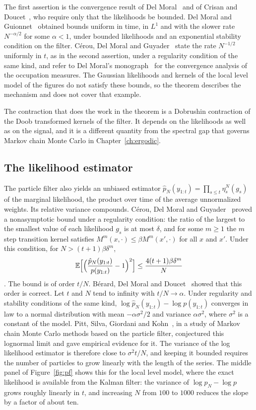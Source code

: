The first assertion is the convergence result of Del Moral~\cite{delmoral1998} and of Crisan and Doucet~\cite{crisandoucet2002}, who require only that the likelihoods be bounded. Del Moral and Guionnet~\cite{delmoralguionnet2001} obtained bounds uniform in time, in $L^1$ and with the slower rate $N^{-\alpha/2}$ for some $\alpha<1$, under bounded likelihoods and an exponential stability condition on the filter. C\'erou, Del Moral and Guyader~\cite{cdg2011} state the rate $N^{-1/2}$ uniformly in $t$, as in the second assertion, under a regularity condition of the same kind, and refer to Del Moral's monograph~\cite{delmoral2004} for the convergence analysis of the occupation measures. The Gaussian likelihoods and kernels of the local level model of the figures do not satisfy these bounds, so the theorem describes the mechanism and does not cover that example.

The contraction that does the work in the theorem is a Dobrushin contraction of the Doob transformed kernels of the filter. It depends on the likelihoods as well as on the signal, and it is a different quantity from the spectral gap that governs Markov chain Monte Carlo in Chapter~\ref{ch:ergodic}.

\subsection{The likelihood estimator}

The particle filter also yields an unbiased estimator $\hat p_N(y_{1:t}) = \prod_{s\leq t}\eta^N_s(g_s)$ of the marginal likelihood, the product over time of the average unnormalized weights. Its relative variance compounds. C\'erou, Del Moral and Guyader~\cite{cdg2011} proved a nonasymptotic bound under a regularity condition: the ratio of the largest to the smallest value of each likelihood $g_s$ is at most $\delta$, and for some $m\geq1$ the $m$ step transition kernel satisfies $M^m(x,\cdot)\leq\beta M^m(x',\cdot)$ for all $x$ and $x'$. Under this condition, for $N>(t+1)\beta\delta^m$,
\[
\mathbb{E}\Big[\Big(\frac{\hat p_N(y_{1:t})}{p(y_{1:t})}-1\Big)^2\Big]\leq\frac{4(t+1)\beta\delta^m}{N}
\]
\cite[Corollary~5.2]{cdg2011}. The bound is of order $t/N$. B\'erard, Del Moral and Doucet~\cite{berard2014} showed that this order is correct. Let $t$ and $N$ tend to infinity with $t/N\to\alpha$. Under regularity and stability conditions of the same kind, $\log\hat p_N(y_{1:t})-\log p(y_{1:t})$ converges in law to a normal distribution with mean $-\alpha\sigma^2/2$ and variance $\alpha\sigma^2$, where $\sigma^2$ is a constant of the model. Pitt, Silva, Giordani and Kohn~\cite{pitt2012}, in a study of Markov chain Monte Carlo methods based on the particle filter, conjectured this lognormal limit and gave empirical evidence for it. The variance of the log likelihood estimator is therefore close to $\sigma^2t/N$, and keeping it bounded requires the number of particles to grow linearly with the length of the series. The middle panel of Figure~\ref{fig:pf} shows this for the local level model, where the exact likelihood is available from the Kalman filter: the variance of $\log\hat p_N-\log p$ grows roughly linearly in $t$, and increasing $N$ from $100$ to $1000$ reduces the slope by a factor of about ten.

